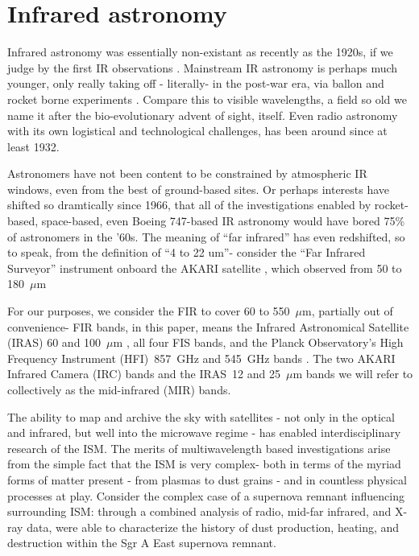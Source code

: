   \section{Infrared astronomy}

    Infrared astronomy was essentially non-existant as recently as the 1920s, if we judge by the first IR observations \citep{pettit22, pettit28}. Mainstream IR astronomy is perhaps much younger, only really taking off - literally- in the post-war era, via ballon and rocket borne experiments \citep{johnson66}. Compare this to visible wavelengths, a field so old we name it after the bio-evolutionary advent of sight, itself. Even radio astronomy with its own logistical and technological challenges, has been around since at least 1932.

    Astronomers have not been content to be constrained by atmospheric IR windows, even from the best of ground-based sites. Or perhaps interests have shifted so dramtically since 1966, that all of the investigations enabled by rocket-based, space-based, even Boeing 747-based IR astronomy \citep{young12} would have bored 75\% of astronomers in the '60s. The meaning of ``far infrared'' has even redshifted, so to speak, from the \cite{johnson66} definition of ``4 to 22 um''- consider the ``Far Infrared Surveyor'' instrument onboard the AKARI satellite \citep{akari07}, which observed from 50 to 180~$\mu$m \citep{kawada07}

     For our purposes, we consider the FIR to cover 60 to 550~$\mu$m, partially out of convenience- FIR bands, in this paper, means the Infrared Astronomical Satellite (IRAS) 60 and 100~$\mu$m \citep{iras84}, all four FIS bands, and the Planck Observatory's High Frequency Instrument (HFI)~857~GHz and 545~GHz bands \citep{planckEarly11I, hfi14viii}. The two AKARI Infrared Camera (IRC) \citep{irc07,ishihara10} bands and the IRAS~12 and 25~$\mu$m bands we will refer to collectively as the mid-infrared (MIR) bands.

    The ability to map and archive the sky with satellites - not only in the optical and infrared, but well into the microwave regime - has enabled interdisciplinary research of the ISM. The merits of multiwavelength based investigations arise from the simple fact that the ISM is very complex- both in terms of the myriad forms of matter present - from plasmas to dust grains - and in countless physical processes at play. Consider the complex case of a supernova remnant influencing surrounding ISM: through a combined analysis of radio, mid-far infrared, and X-ray data, \cite{lau15} were able to characterize the history of dust production, heating, and destruction within the Sgr A East supernova remnant.

